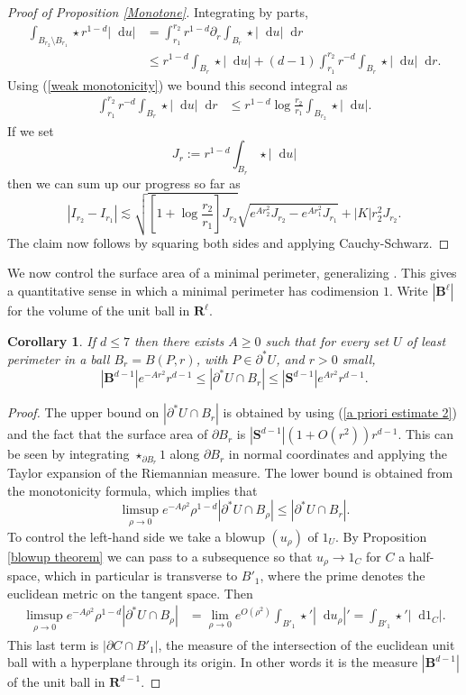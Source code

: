 \documentclass[reqno,11pt]{amsart}
\newcommand{\RR}{\mathbf{R}}
\newcommand{\Sph}{\mathbf S}
\newcommand{\Ball}{\mathbf{B}}
\newcommand*\dif{\mathop{}\!\mathrm{d}}
\newtheorem{corollary}[theorem]{Corollary}
\theoremstyle{definition}
\numberwithin{equation}{section}
\begin{document}
\begin{proof}[Proof of Proposition \ref{Monotone}]
Integrating by parts,
\begin{align*}
\int_{B_{r_2} \setminus B_{r_1}} \star r^{1 - d} |\dif u| &= \int_{r_1}^{r_2} r^{1 - d} \partial_r \int_{B_r} \star |\dif u| \dif r \\
&\leq r^{1 - d} \int_{B_r} \star |\dif u| + (d - 1) \int_{r_1}^{r_2} r^{-d} \int_{B_r} \star |\dif u| \dif r.
\end{align*}
Using (\ref{weak monotonicity}) we bound this second integral as
\begin{align*}
\int_{r_1}^{r_2} r^{-d} \int_{B_r} \star |\dif u| \dif r &\leq r^{1 - d} \log \frac{r_2}{r_1} \int_{B_{r_2}} \star |\dif u|.
\end{align*}
If we set
$$J_r := r^{1 - d} \int_{B_r} \star |\dif u|$$
then we can sum up our progress so far as
$$|I_{r_2} - I_{r_1}| \lesssim \sqrt{\left[1 + \log \frac{r_2}{r_1}\right] J_{r_2}} \sqrt{e^{Ar_2^2} J_{r_2} - e^{Ar_1^2} J_{r_1}} + |K|r_2^2 J_{r_2}.$$
The claim now follows by squaring both sides and applying Cauchy-Schwarz.
\end{proof}

We now control the surface area of a minimal perimeter, generalizing \cite[Remark 5.13]{Giusti77}.
This gives a quantitative sense in which a minimal perimeter has codimension $1$.
Write $|\Ball^\ell|$ for the volume of the unit ball in $\RR^\ell$.

\begin{corollary}\label{doubling dimension}
If $d \leq 7$ then there exists $A \geq 0$ such that for every set $U$ of least perimeter in a ball $B_r = B(P, r)$, with $P \in \partial^* U$, and $r > 0$ small,
$$|\Ball^{d - 1}|e^{-Ar^2}r^{d - 1} \leq |\partial^*U \cap B_r| \leq |\Sph^{d - 1}|e^{Ar^2} r^{d - 1}.$$
\end{corollary}
\begin{proof}
The upper bound on $|\partial^* U \cap B_r|$ is obtained by using (\ref{a priori estimate 2}) and the fact that the surface area of $\partial B_r$ is $|\Sph^{d - 1}|(1 + O(r^2))r^{d - 1}$.
This can be seen by integrating $\star_{\partial B_r} 1$ along $\partial B_r$ in normal coordinates and applying the Taylor expansion of the Riemannian measure.
The lower bound is obtained from the monotonicity formula, which implies that
$$\limsup_{\rho \to 0} e^{-A\rho^2} \rho^{1 - d} |\partial^* U \cap B_\rho| \leq |\partial^* U \cap B_r|.$$
To control the left-hand side we take a blowup $(u_\rho)$ of $1_U$.
By Proposition \ref{blowup theorem} we can pass to a subsequence so that $u_\rho \to 1_C$ for $C$ a half-space, which in particular is transverse to $B'_1$, where the prime denotes the euclidean metric on the tangent space.
Then
\begin{align*}
\limsup_{\rho \to 0} e^{-A\rho^2} \rho^{1 - d} |\partial^* U \cap B_\rho| &= \lim_{\rho \to 0} e^{O(\rho^2)} \int_{B'_1} \star'|\dif u_\rho|' = \int_{B'_1} \star'|\dif 1_C|.
\end{align*}
This last term is $|\partial C \cap B'_1|$, the measure of the intersection of the euclidean unit ball with a hyperplane through its origin.
In other words it is the measure $|\Ball^{d - 1}|$ of the unit ball in $\RR^{d - 1}$.
\end{proof}
\end{document}
